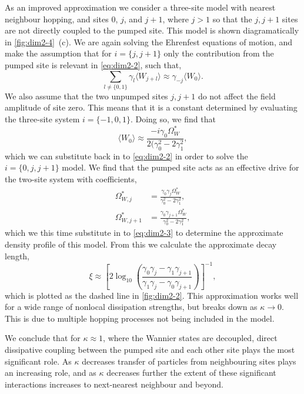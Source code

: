 As an improved approximation we consider a three-site model with nearest neighbour hopping, and sites 0, \(j\), and \(j+1\), where \(j > 1\) so that the \(j,j+1\) sites are not directly coupled to the pumped site. This model is shown diagramatically in \cref{fig:dim2-4}~(c). We are again solving the Ehrenfest equations of motion, and make the assumption that for \(i=\{j,j+1\}\) only the contribution from the pumped site is relevant in \cref{eq:dim2-2}, such that,
\begin{equation}
	\sum_{l \neq \{0,1\}} \gamma_{l} \langle W_{j+l} \rangle \approx \gamma_{-j} \langle W_{0} \rangle.
	\label{eq:dim2-15}
\end{equation}
We also assume that the two unpumped sites \(j, j+1\) do not affect the field amplitude of site zero. This means that it is a constant determined by evaluating the three-site system \(i=\{-1,0,1\}\). Doing so, we find that
\begin{equation}
	\langle W_{0} \rangle \approx \frac{-i\gamma_{0}\Omega_{W}^{*}}{2(\gamma_{0}^{2} - 2\gamma_{1}^{2}},
	\label{eq:dim2-16}
\end{equation}
which we can substitute back in to \cref{eq:dim2-2} in order to solve the \(i=\{0,j,j+1\}\) model. We find that the pumped site acts as an effective drive for the two-site system with coefficients,
\begin{align}
	\Omega_{W,j}^{*} &= \frac{\gamma_{0}\gamma_{j}\Omega_{W}^{*}}{\gamma_{0}^{2} - 2\gamma_{1}^{2}}, \label{eq:dim2-17} \\
	\Omega_{W,j+1}^{*} &= \frac{\gamma_{0}\gamma_{j+1}\Omega_{W}^{*}}{\gamma_{0}^{2} - 2\gamma_{1}^{2}}, \label{eq:dim2-18}
\end{align}
which we this time substitute in to \cref{eq:dim2-3} to determine the approximate density profile of this model. From this we calculate the approximate decay length,
\begin{equation}
	\xi \approx \left[ 2\log_{10}\left(\frac{\gamma_{0}\gamma_{j} - \gamma_{1}\gamma_{j+1}}{\gamma_{1}\gamma_{j} - \gamma_{0}\gamma_{j+1}}\right)\right]^{-1},
	\label{eq:dim2-19}
\end{equation}
which is plotted as the dashed line in \cref{fig:dim2-2}. This approximation works well for a wide range of nonlocal dissipation strengths, but breaks down as \(\kappa \rightarrow 0\). This is due to multiple hopping processes not being included in the model.

We conclude that for \(\kappa \approx 1\), where the Wannier states are decoupled, direct dissipative coupling between the pumped site and each other site plays the most significant role. As \(\kappa\) decreases transfer of particles from neighbouring sites plays an increasing role, and as \(\kappa\) decreases further the extent of these significant interactions increases to next-nearest neighbour and beyond.

